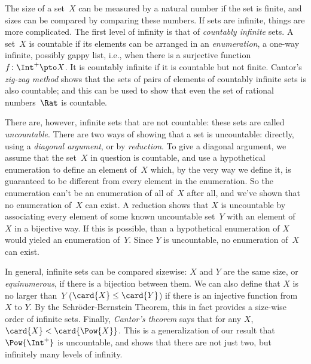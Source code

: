 The size of a set~$X$ can be measured by a natural number if the set
is finite, and sizes can be compared by comparing these numbers. If sets
are infinite, things are more complicated.  The first level of
infinity is that of \emph{countably infinite} sets. A set~$X$ is
countable if its elements can be arranged in an \emph{enumeration}, a
one-way infinite, possibly gappy list, i.e., when there is a
surjective function~$f\colon \Int^+ \pto X$. It is countably infinite
if it is countable but not finite. Cantor's \emph{zig-zag method}
shows that the sets of pairs of elements of countably infinite sets is
also countable; and this can be used to show that even the set of
rational numbers~$\Rat$ is countable.

There are, however, infinite sets that are not countable: these sets
are called \emph{uncountable}. There are two ways of showing that a
set is uncountable: directly, using a \emph{diagonal argument}, or by
\emph{reduction}. To give a diagonal argument, we assume that the
set~$X$ in question is countable, and use a hypothetical enumeration
to define an element of~$X$ which, by the very way we define it, is
guaranteed to be different from every element in the enumeration. So
the enumeration can't be an enumeration of all of~$X$ after all, and
we've shown that no enumeration of~$X$ can exist.  A reduction shows
that $X$ is uncountable by associating every element of some known
uncountable set~$Y$ with an element of~$X$ in a bijective way. If this
is possible, than a hypothetical enumeration of $X$ would yieled an
enumeration of~$Y$. Since $Y$ is uncountable, no enumeration of~$X$
can exist.

In general, infinite sets can be compared sizewise: $X$ and $Y$ are
the same size, or \emph{equinumerous}, if there is a bijection between
them. We can also define that $X$ is no larger than~$Y$ ($\card{X} \le
\card{Y}$) if there is an injective function from $X$ to
$Y$. By the Schr\"oder-Bernstein Theorem, this in fact provides a
size-wise order of infinite sets.  Finally, \emph{Cantor's theorem}
says that for any $X$, $\card{X} < \card{\Pow{X}}$. This is a
generalization of our result that $\Pow{\Int^+}$ is uncountable, and
shows that there are not just two, but infinitely many levels of
infinity.
